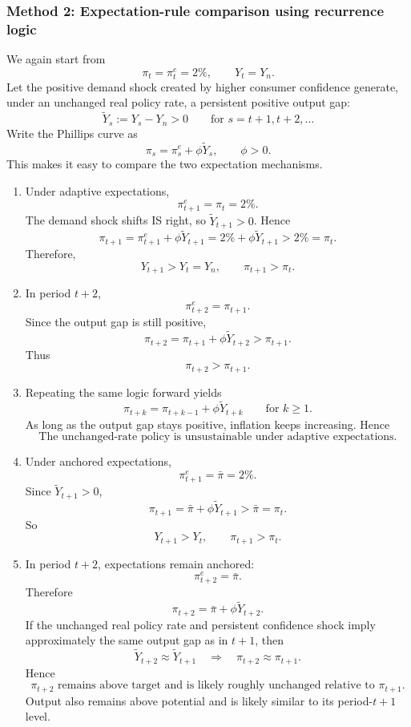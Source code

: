 \documentclass[12pt]{article}
\begin{document}
\subsubsection{Method 2: Expectation-rule comparison using recurrence logic}
We again start from
\[
\pi_t=\pi_t^e=2\%,
\qquad
Y_t=Y_n.
\]
Let the positive demand shock created by higher consumer confidence generate, under an unchanged real policy rate, a persistent positive output gap:
\[
\widetilde Y_s := Y_s-Y_n >0
\qquad \text{for } s=t+1,t+2,\dots
\]
Write the Phillips curve as
\[
\pi_s = \pi_s^e + \phi \widetilde Y_s,
\qquad \phi>0.
\]
This makes it easy to compare the two expectation mechanisms.

\begin{enumerate}[label=(\alph*)]
    \item
    Under adaptive expectations,
    \[
    \pi_{t+1}^e=\pi_t=2\%.
    \]
    The demand shock shifts IS right, so \(\widetilde Y_{t+1}>0\). Hence
    \[
    \pi_{t+1}=\pi_{t+1}^e+\phi\widetilde Y_{t+1}
    =2\%+\phi\widetilde Y_{t+1}>2\%=\pi_t.
    \]
    Therefore,
    \[
    \boxed{Y_{t+1}>Y_t=Y_n,\qquad \pi_{t+1}>\pi_t.}
    \]

    \item
    In period \(t+2\),
    \[
    \pi_{t+2}^e=\pi_{t+1}.
    \]
    Since the output gap is still positive,
    \[
    \pi_{t+2}=\pi_{t+1}+\phi\widetilde Y_{t+2}>\pi_{t+1}.
    \]
    Thus
    \[
    \boxed{\pi_{t+2}>\pi_{t+1}.}
    \]

    \item
    Repeating the same logic forward yields
    \[
    \pi_{t+k} = \pi_{t+k-1}+\phi\widetilde Y_{t+k}
    \qquad \text{for } k\ge 1.
    \]
    As long as the output gap stays positive, inflation keeps increasing. Hence
    \[
    \boxed{\text{The unchanged-rate policy is unsustainable under adaptive expectations.}}
    \]

    \item
    Under anchored expectations,
    \[
    \pi_{t+1}^e=\bar{\pi}=2\%.
    \]
    Since \(\widetilde Y_{t+1}>0\),
    \[
    \pi_{t+1}=\bar{\pi}+\phi\widetilde Y_{t+1}>\bar{\pi}=\pi_t.
    \]
    So
    \[
    \boxed{Y_{t+1}>Y_t,\qquad \pi_{t+1}>\pi_t.}
    \]

    \item
    In period \(t+2\), expectations remain anchored:
    \[
    \pi_{t+2}^e=\bar{\pi}.
    \]
    Therefore
    \[
    \pi_{t+2}=\bar{\pi}+\phi\widetilde Y_{t+2}.
    \]
    If the unchanged real policy rate and persistent confidence shock imply approximately the same output gap as in \(t+1\), then
    \[
    \widetilde Y_{t+2}\approx \widetilde Y_{t+1}
    \quad\Longrightarrow\quad
    \pi_{t+2}\approx \pi_{t+1}.
    \]
    Hence
    \[
    \boxed{\pi_{t+2}\text{ remains above target and is likely roughly unchanged relative to }\pi_{t+1}.}
    \]
    Output also remains above potential and is likely similar to its period-\(t+1\) level.


\end{enumerate}
\end{document}
